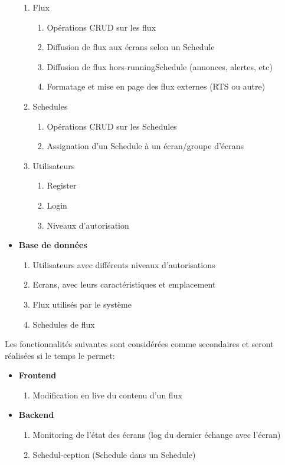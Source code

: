 \documentclass[french]{article}
\begin{document}
\begin{itemize}
\begin{enumerate}
		\item Flux
		\begin{enumerate}
			\item Opérations CRUD sur les flux
			\item Diffusion de flux aux écrans selon un Schedule
			\item Diffusion de flux hors-runningSchedule (annonces, alertes, etc)
			\item Formatage et mise en page des flux externes (RTS ou autre)
		\end{enumerate}
		\item Schedules
		\begin{enumerate}
			\item Opérations CRUD sur les Schedules
			\item Assignation d'un Schedule à un écran/groupe d'écrans
		\end{enumerate}
		\item Utilisateurs
		 \begin{enumerate}
			\item Register 
			\item Login 
			\item Niveaux d'autorisation
		\end{enumerate}
	\end{enumerate}
	
	\item \textbf{Base de données}
	\begin{enumerate}
		\item Utilisateurs avec différents niveaux d'autorisations
		\item Ecrans, avec leurs caractéristiques et emplacement
		\item Flux utilisés par le système
		\item Schedules de flux \newline
	\end{enumerate}
\end{itemize}

Les fonctionnalités suivantes sont considérées comme secondaires et seront réalisées si le temps le permet:
\begin{itemize}
	\item \textbf{Frontend}
	\begin{enumerate}
		\item Modification en live du contenu d'un flux
	\end{enumerate}
	\item \textbf{Backend}
	\begin{enumerate}
		\item Monitoring de l'état des écrans (log du dernier échange avec l'écran)
		\item Schedul-ception (Schedule dans un Schedule)
	\end{enumerate}
\end{itemize}
\end{document}
